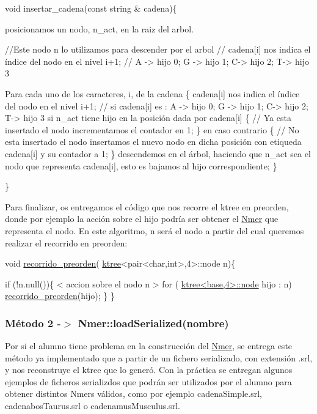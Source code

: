 \begin{DoxyCode}
\textcolor{keywordtype}{void} insertar\_cadena(\textcolor{keyword}{const} \textcolor{keywordtype}{string} & cadena)\{

posicionamos un nodo, n\_act, en la raiz del arbol.

 \textcolor{comment}{//Este nodo n lo utilizamos para descender por el arbol}
\textcolor{comment}{// cadena[i] nos indica el índice del nodo en el  nivel i+1;}
\textcolor{comment}{// A -> hijo 0; G -> hijo 1; C-> hijo 2; T-> hijo 3}

 Para cada uno de los caracteres, i, de la cadena \{
    cadena[i] nos indica el índice del nodo en el  nivel i+1;
    \textcolor{comment}{// si cadena[i] es : A -> hijo 0; G -> hijo 1; C-> hijo 2; T-> hijo 3}
    si n\_act tiene hijo en la posición dada por cadena[i] \{ \textcolor{comment}{// Ya esta insertado el nodo}
      incrementamos el contador en 1;
    \}
    en caso contrario \{ \textcolor{comment}{//  No esta insertado el nodo}
        insertamos el nuevo nodo en dicha posición con etiqueda cadena[i] y su contador a 1;
    \}
   descendemos en el árbol, haciendo que n\_act sea el nodo que representa cadena[i], esto es bajamos al 
      hijo correspondiente;
 \}

\}
\end{DoxyCode}


Para finalizar, os entregamos el código que nos recorre el ktree en preorden, donde por ejemplo la acción sobre el hijo podría ser obtener el \hyperlink{classNmer}{Nmer} que representa el nodo. En este algoritmo, n será el nodo a partir del cual queremos realizar el recorrido en preorden\+:


\begin{DoxyCode}
\textcolor{keywordtype}{void} \hyperlink{ejemploKtree_8cpp_a7ae38f4399966752d1ca1d20d24b63ac}{recorrido\_preorden}( \hyperlink{classktree}{ktree}<pair<char,int>,4>::node  n)\{

\textcolor{keywordflow}{if} (!n.null())\{
   < accion sobre el nodo n >
   \textcolor{keywordflow}{for} ( \hyperlink{classktree_1_1node}{ktree<base,4>::node} hijo : n)
     \hyperlink{ejemploKtree_8cpp_a7ae38f4399966752d1ca1d20d24b63ac}{recorrido\_preorden}(hijo);
  \}
\}
\end{DoxyCode}
\hypertarget{index_load}{}\subsubsection{Método 2 -\/$>$  Nmer\+::load\+Serialized(nombre)}\label{index_load}
Por si el alumno tiene problema en la construcción del \hyperlink{classNmer}{Nmer}, se entrega este método ya implementado que a partir de un fichero serializado, con extensión .srl, y nos reconstruye el ktree que lo generó. Con la práctica se entregan algunos ejemplos de ficheros serializdos que podrán ser utilizados por el alumno para obtener distintos Nmers válidos, como por ejemplo cadena\+Simple.\+srl, cadenabos\+Taurus.\+srl o cadenamus\+Musculus.\+srl.

